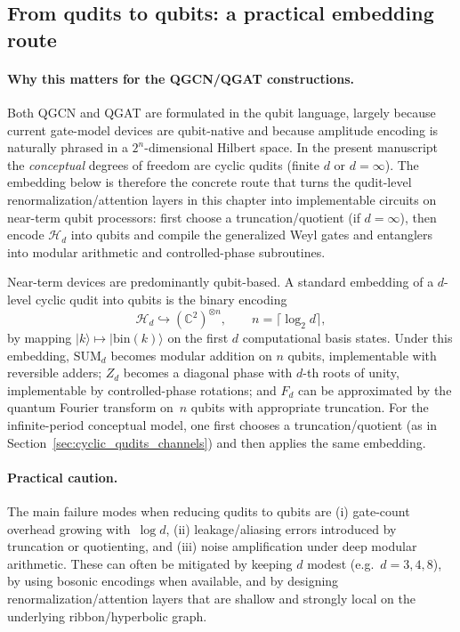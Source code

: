 \documentclass[11pt,oneside]{amsbook}
\numberwithin{equation}{section}
\theoremstyle{plain}
\theoremstyle{definition}
\theoremstyle{remark}
\newcommand{\ket}[1]{\lvert #1 \rangle}
\begin{document}
\subsection{From qudits to qubits: a practical embedding route}

\paragraph{Why this matters for the QGCN/QGAT constructions.}
Both QGCN \cite{Zheng2021QGCN} and QGAT \cite{Ning2025QGAT} are formulated in the qubit language, largely because current
gate-model devices are qubit-native and because amplitude encoding is naturally phrased in a $2^n$-dimensional Hilbert space.
In the present manuscript the \emph{conceptual} degrees of freedom are cyclic qudits (finite $d$ or $d=\infty$).
The embedding below is therefore the concrete route that turns the qudit-level renormalization/attention layers in this chapter
into implementable circuits on near-term qubit processors: first choose a truncation/quotient (if $d=\infty$), then encode
$\mathcal{H}_d$ into qubits and compile the generalized Weyl gates and entanglers into modular arithmetic and controlled-phase
subroutines.

Near-term devices are predominantly qubit-based. A standard embedding of a $d$-level cyclic qudit into
qubits is the binary encoding
\[
  \mathcal{H}_d \hookrightarrow (\mathbb{C}^2)^{\otimes n},\qquad n=\lceil \log_2 d\rceil,
\]
by mapping $\ket{k}\mapsto \ket{\mathrm{bin}(k)}$ on the first $d$ computational basis states.
Under this embedding, $\mathrm{SUM}_d$ becomes modular addition on $n$ qubits, implementable with
reversible adders; $Z_d$ becomes a diagonal phase with $d$-th roots of unity, implementable by
controlled-phase rotations; and $F_d$ can be approximated by the quantum Fourier transform on~$n$ qubits
with appropriate truncation.
For the infinite-period conceptual model, one first chooses a truncation/quotient (as in
Section~\ref{sec:cyclic_qudits_channels}) and then applies the same embedding.

\paragraph{Practical caution.}
The main failure modes when reducing qudits to qubits are (i) gate-count overhead growing with~$\log d$,
(ii) leakage/aliasing errors introduced by truncation or quotienting, and (iii) noise amplification
under deep modular arithmetic. These can often be mitigated by keeping $d$ modest (e.g.\ $d=3,4,8$),
by using bosonic encodings when available, and by designing renormalization/attention layers that are
shallow and strongly local on the underlying ribbon/hyperbolic graph.
\end{document}

